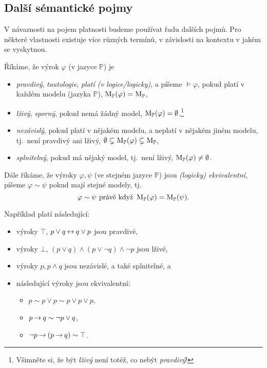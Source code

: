 \subsection{Další sémantické pojmy}

V návaznosti na pojem platnosti budeme používat řadu dalších pojmů. Pro některé vlastnosti existuje více různých termínů, v závislosti na kontextu v jakém se vyskytnou.

\begin{definition}\label{definition:semantic-notions}
Říkáme, že výrok $\varphi$ (v jazyce $\mathbb P$) je
\begin{itemize}
    \item \emph{pravdivý}, \emph{tautologie}, \emph{platí (v logice/logicky)}, a píšeme $\models \varphi$, pokud platí v každém modelu (jazyka $\mathbb P$), $\operatorname{M}_\mathbb P(\varphi)=\operatorname{M}_\mathbb P$,
    \item \emph{lživý}, \emph{sporný}, pokud nemá žádný model, $\operatorname{M}_\mathbb P(\varphi)=\emptyset$.\footnote{Všimněte si, že být \emph{lživý} není totéž, co nebýt \emph{pravdivý}!}
    \item \emph{nezávislý}, pokud platí v nějakém modelu, a neplatí v nějakém jiném modelu, tj.\ není pravdivý ani lživý, $\emptyset\subsetneq\operatorname{M}_\mathbb P(\varphi)\subsetneq\operatorname{M}_\mathbb P$,
    \item \emph{splnitelný}, pokud má nějaký model, tj.\ není lživý, $\operatorname{M}_\mathbb P(\varphi)\neq\emptyset$.
\end{itemize}
Dále říkáme, že výroky $\varphi,\psi$ (ve stejném jazyce $\mathbb P$) jsou \emph{(logicky) ekvivalentní}, píšeme $\varphi\sim\psi$ pokud mají stejné modely, tj.\
$$
\varphi\sim\psi\text{ právě když }\operatorname{M}_\mathbb P(\varphi)=\operatorname{M}_\mathbb P(\psi).
$$    
\end{definition}

\begin{example} Například platí následující:
    \begin{itemize}
        \item výroky $\top$, $p\lor q\mathbin{\leftrightarrow} q\lor p$ jsou pravdivé,
        \item výroky $\bot$, $(p\lor q)\land (p\lor \neg q)\land \neg p$ jsou lživé,
        \item výroky $p, p\land q$ jsou nezávislé, a také splnitelné, a
        \item následující výroky jsou ekvivalentní: 
        \begin{itemize}
            \item $p\sim p\lor p\sim p\lor p\lor p$,
            \item $p\mathbin{\rightarrow} q\sim \neg p\lor q$,
            \item $\neg p \mathbin{\rightarrow} (p\mathbin{\rightarrow} q) \sim \top $.
        \end{itemize}  
    \end{itemize}      
\end{example}

